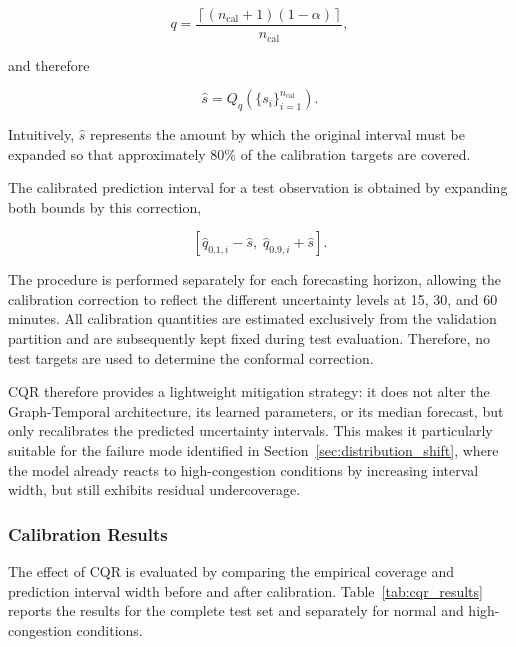 \begin{equation}
    q =
    \frac{\left\lceil (n_{\mathrm{cal}}+1)(1-\alpha) \right\rceil}
         {n_{\mathrm{cal}}},
    \label{eq:cqr_quantile_level}
\end{equation}

and therefore

\begin{equation}
    \hat{s}
    =
    Q_q\left(\{s_i\}_{i=1}^{n_{\mathrm{cal}}}\right).
    \label{eq:cqr_correction}
\end{equation}

Intuitively, $\hat{s}$ represents the amount by which the original interval
must be expanded so that approximately 80\% of the calibration targets are
covered.

The calibrated prediction interval for a test observation is obtained by
expanding both bounds by this correction,

\begin{equation}
    \left[
        \hat{q}_{0.1,i} - \hat{s},
        \;
        \hat{q}_{0.9,i} + \hat{s}
    \right].
    \label{eq:cqr_interval}
\end{equation}

The procedure is performed separately for each forecasting horizon, allowing
the calibration correction to reflect the different uncertainty levels at
15, 30, and 60 minutes. All calibration quantities are estimated exclusively
from the validation partition and are subsequently kept fixed during test
evaluation. Therefore, no test targets are used to determine the conformal
correction.

CQR therefore provides a lightweight mitigation strategy: it does not alter
the Graph-Temporal architecture, its learned parameters, or its median
forecast, but only recalibrates the predicted uncertainty intervals. This
makes it particularly suitable for the failure mode identified in
Section~\ref{sec:distribution_shift}, where the model already reacts to
high-congestion conditions by increasing interval width, but still exhibits
residual undercoverage.


\subsubsection{Calibration Results}
\label{subsubsec:cqr_results}

The effect of CQR is evaluated by comparing the empirical coverage and
prediction interval width before and after calibration. Table~\ref{tab:cqr_results}
reports the results for the complete test set and separately for normal and
high-congestion conditions.

